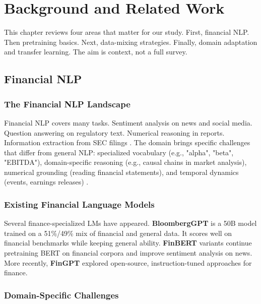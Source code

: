 \chapter{Background and Related Work}

This chapter reviews four areas that matter for our study. First, financial NLP. Then pretraining basics. Next, data-mixing strategies. Finally, domain adaptation and transfer learning. The aim is context, not a full survey.

\section{Financial NLP}

\subsection{The Financial NLP Landscape}

Financial NLP covers many tasks. Sentiment analysis on news and social media. Question answering on regulatory text. Numerical reasoning in reports. Information extraction from SEC filings \parencite{araci2019finbert, chen2021finqa}. The domain brings specific challenges that differ from general NLP: specialized vocabulary (e.g., "alpha", "beta", "EBITDA"), domain-specific reasoning (e.g., causal chains in market analysis), numerical grounding (reading financial statements), and temporal dynamics (events, earnings releases) \parencite{wu2023bloomberggpt, araci2019finbert}.

\subsection{Existing Financial Language Models}

Several finance-specialized LMs have appeared. \textbf{BloombergGPT} \parencite{wu2023bloomberggpt} is a 50B model trained on a 51\%/49\% mix of financial and general data. It scores well on financial benchmarks while keeping general ability. \textbf{FinBERT} variants \parencite{araci2019finbert, yang2020finbert} continue pretraining BERT on financial corpora and improve sentiment analysis on news. More recently, \textbf{FinGPT} \parencite{yang2023fingpt} explored open-source, instruction-tuned approaches for finance.

\subsection{Domain-Specific Challenges}

